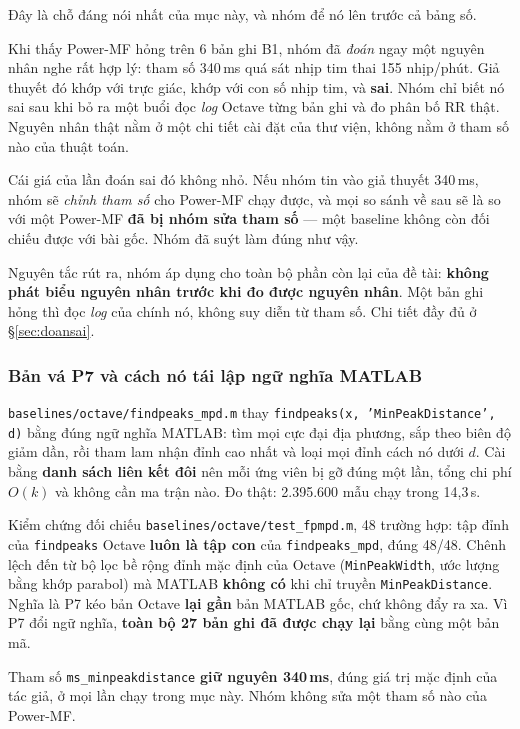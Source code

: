 Đây là chỗ đáng nói nhất của mục này, và nhóm để nó lên trước cả bảng số.

Khi thấy Power-MF hỏng trên 6 bản ghi B1, nhóm đã \textit{đoán} ngay một nguyên nhân nghe rất hợp lý:
tham số 340\,ms quá sát nhịp tim thai 155 nhịp/phút. Giả thuyết đó khớp với trực giác, khớp với con số
nhịp tim, và \textbf{sai}. Nhóm chỉ biết nó sai sau khi bỏ ra một buổi đọc \textit{log} Octave từng bản
ghi và đo phân bố RR thật. Nguyên nhân thật nằm ở một chi tiết cài đặt của thư viện, không nằm ở tham số
nào của thuật toán.

Cái giá của lần đoán sai đó không nhỏ. Nếu nhóm tin vào giả thuyết 340\,ms, nhóm sẽ \textit{chỉnh tham
số} cho Power-MF chạy được, và mọi so sánh về sau sẽ là so với một Power-MF \textbf{đã bị nhóm sửa tham
số} --- một baseline không còn đối chiếu được với bài gốc. Nhóm đã suýt làm đúng như vậy.

Nguyên tắc rút ra, nhóm áp dụng cho toàn bộ phần còn lại của đề tài: \textbf{không phát biểu nguyên nhân
trước khi đo được nguyên nhân}. Một bản ghi hỏng thì đọc \textit{log} của chính nó, không suy diễn từ
tham số. Chi tiết đầy đủ ở \S\ref{sec:doansai}.

\subsubsection{Bản vá P7 và cách nó tái lập ngữ nghĩa MATLAB}

\texttt{baselines/octave/findpeaks\_mpd.m} thay \texttt{findpeaks(x, 'MinPeakDistance', d)} bằng đúng
ngữ nghĩa MATLAB: tìm mọi cực đại địa phương, sắp theo biên độ giảm dần, rồi tham lam nhận đỉnh cao nhất
và loại mọi đỉnh cách nó dưới $d$. Cài bằng \textbf{danh sách liên kết đôi} nên mỗi ứng viên bị gỡ đúng
một lần, tổng chi phí $O(k)$ và không cần ma trận nào. Đo thật: 2.395.600 mẫu chạy trong 14,3\,s.

Kiểm chứng đối chiếu \texttt{baselines/octave/test\_fpmpd.m}, 48 trường hợp: tập đỉnh của
\texttt{findpeaks} Octave \textbf{luôn là tập con} của \texttt{findpeaks\_mpd}, đúng 48/48. Chênh lệch
đến từ bộ lọc bề rộng đỉnh mặc định của Octave (\texttt{MinPeakWidth}, ước lượng bằng khớp parabol) mà
MATLAB \textbf{không có} khi chỉ truyền \texttt{MinPeakDistance}. Nghĩa là P7 kéo bản Octave
\textbf{lại gần} bản MATLAB gốc, chứ không đẩy ra xa. Vì P7 đổi ngữ nghĩa, \textbf{toàn bộ 27 bản ghi đã
được chạy lại} bằng cùng một bản mã.

Tham số \texttt{ms\_minpeakdistance} \textbf{giữ nguyên 340\,ms}, đúng giá trị mặc định của tác giả, ở
mọi lần chạy trong mục này. Nhóm không sửa một tham số nào của Power-MF.

